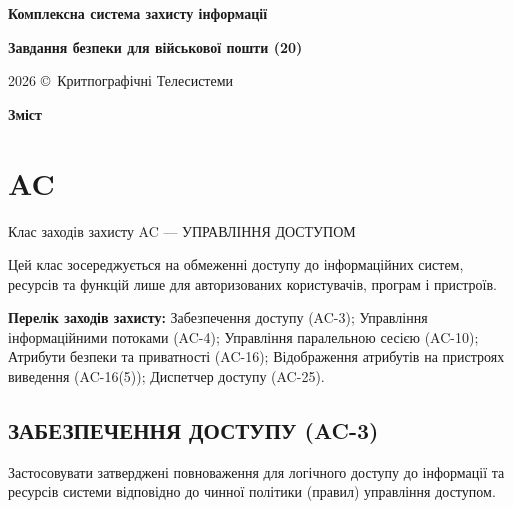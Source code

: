 \documentclass{article}
\newcommand\HUGE[1]{\fontsize{40}{40}\selectfont #1}
\begin{document}
\pagestyle{fancy}

\begin{titlepage}
  \AddToShipoutPictureBG*{\AtPageLowerLeft{\color{nato}\rule{\paperwidth}{\paperheight}}}
  \color{white}\thispagestyle{empty}\vspace*{2cm}\centering
  {\Huge  \textbf{Комплексна система захисту інформації} \par} \vspace{1cm}
  {\HUGE  \textbf{Завдання безпеки для військової пошти (20)} \par} \vspace{1cm}
  \vfill
  {\large 2026 \copyright\ Критпографічні Телесистеми \par}
\end{titlepage}

\newpage

\begin{center}
  {\Huge\color{nato}\bfseries Зміст\par}
\end{center}
\vspace{40pt}
\tableofcontents

\begin{abstract}
Завдання з безпеки для забезпечення конфіденційності, цілісності та гарантованої доставки повідомлень (MHS X.420) з підтримкою грифування.
\end{abstract}

\section{AC}
Клас заходів захисту AC --- УПРАВЛІННЯ ДОСТУПОМ

Цей клас зосереджується на обмеженні доступу до інформаційних систем, ресурсів та функцій лише для авторизованих користувачів, програм і пристроїв.

\textbf{Перелік заходів захисту:} Забезпечення доступу (AC-3); Управління інформаційними потоками (AC-4); Управління паралельною сесією (AC-10); Атрибути безпеки та приватності (AC-16); Відображення атрибутів на пристроях виведення (AC-16(5)); Диспетчер доступу (AC-25).

\subsection{ЗАБЕЗПЕЧЕННЯ ДОСТУПУ (AC-3)}
Застосовувати затверджені повноваження для логічного доступу до інформації та ресурсів системи відповідно до чинної політики (правил) управління доступом.
\end{document}
